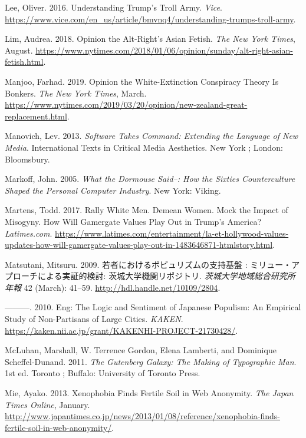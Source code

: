 \documentclass[10pt,british,A4paper,,openany]{memoir}
\begin{document}
\hypertarget{ref-lee_understanding_2016}{}
Lee, Oliver. 2016. Understanding Trump's Troll Army. \emph{Vice}.
\url{https://www.vice.com/en_us/article/bmvnq4/understanding-trumps-troll-army}.

\hypertarget{ref-lim_opinion_2018}{}
Lim, Audrea. 2018. Opinion the Alt-Right's Asian Fetish. \emph{The New
York Times}, August.
\url{https://www.nytimes.com/2018/01/06/opinion/sunday/alt-right-asian-fetish.html}.

\hypertarget{ref-manjoo_opinion_2019}{}
Manjoo, Farhad. 2019. Opinion the White-Extinction Conspiracy Theory Is
Bonkers. \emph{The New York Times}, March.
\url{https://www.nytimes.com/2019/03/20/opinion/new-zealand-great-replacement.html}.

\hypertarget{ref-manovich_software_2013}{}
Manovich, Lev. 2013. \emph{Software Takes Command: Extending the
Language of New Media}. International Texts in Critical Media
Aesthetics. New York ; London: Bloomsbury.

\hypertarget{ref-markoff_what_2005}{}
Markoff, John. 2005. \emph{What the Dormouse Said--: How the Sixties
Counterculture Shaped the Personal Computer Industry}. New York: Viking.

\hypertarget{ref-martens_rally_2017}{}
Martens, Todd. 2017. Rally White Men. Demean Women. Mock the Impact of
Misogyny. How Will Gamergate Values Play Out in Trump's America?
\emph{Latimes.com}.
\url{https://www.latimes.com/entertainment/la-et-hollywood-values-updates-how-will-gamergate-values-play-out-in-1483646871-htmlstory.html}.

\hypertarget{ref-matsutani__2009}{}
Matsutani, Mitsuru. 2009. 若者におけるポピュリズムの支持基盤 :
ミリュー・アプローチによる実証的検討: 茨城大学機関リポジトリ.
\emph{茨城大学地域総合研究所年報} 42 (March): 41--59.
\url{http://hdl.handle.net/10109/2804}.

\hypertarget{ref-matsutani_eng:_2010}{}
---------. 2010. Eng: The Logic and Sentiment of Japanese Populism: An
Empirical Study of Non-Partisans of Large Cities. \emph{KAKEN}.
\url{https://kaken.nii.ac.jp/grant/KAKENHI-PROJECT-21730428/}.

\hypertarget{ref-mcluhan_gutenberg_2011}{}
McLuhan, Marshall, W. Terrence Gordon, Elena Lamberti, and Dominique
Scheffel-Dunand. 2011. \emph{The Gutenberg Galaxy: The Making of
Typographic Man}. 1st ed. Toronto ; Buffalo: University of Toronto
Press.

\hypertarget{ref-mie_xenophobia_2013}{}
Mie, Ayako. 2013. Xenophobia Finds Fertile Soil in Web Anonymity.
\emph{The Japan Times Online}, January.
\url{http://www.japantimes.co.jp/news/2013/01/08/reference/xenophobia-finds-fertile-soil-in-web-anonymity/}.
\end{document}
